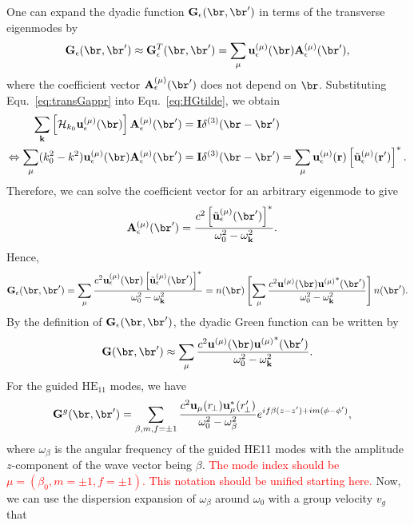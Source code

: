 \documentclass[]{report}
\begin{document}
One can expand the dyadic function $ \mathbf{G}_\epsilon(\br,\br') $ in terms of the transverse eigenmodes by
\begin{align}
\mathbf{G}_\epsilon(\br,\br')\approx\mathbf{G}_\epsilon^T(\br,\br')= \sum_{\mu} \mathbf{u}_\epsilon^{(\mu)}(\br) \mathbf{A}_\epsilon^{(\mu)}(\br'), \label{eq:transGappr}
\end{align}
where the coefficient vector $\mathbf{A}_\epsilon^{(\mu)}(\br')  $ does not depend on $ \br $.
Substituting Equ.~\eqref{eq:transGappr} into Equ.~\eqref{eq:HGtilde}, we obtain
\begin{align}
\sum_{\mathbf{k}} \left[ \mathcal{H}_{k_0}  \mathbf{u}_\epsilon^{(\mu)}(\br)\right] \mathbf{A}_\epsilon^{(\mu)}(\br') &= \mathbf{I}\delta^{(3)}(\br-\br')\\
\Leftrightarrow \sum_\mu (k_0^2-k^2) \mathbf{u}_\epsilon^{(\mu)}(\br) \mathbf{A}_\epsilon^{(\mu)}(\br') &= \mathbf{I}\delta^{(3)}(\br-\br') = \sum_{\mu} \mathbf{u}_\epsilon^{(\mu)}(\mathbf{r} )\left[\tilde{\mathbf{u}}_\epsilon^{(\mu)}(\mathbf{r}^\prime )\right]^*.
\end{align}
Therefore, we can solve the coefficient vector for an arbitrary eigenmode to give
\begin{align}
\mathbf{A}_\epsilon^{(\mu)}(\br') &= \frac{c^2 \left[ \tilde{\mathbf{u}}_\epsilon^{(\mu)}(\br')\right]^*}{\omega_0^2-\omega_{\mathbf{k}}^2}.
\end{align}
Hence, 
\begin{align}
\mathbf{G}_\epsilon(\br,\br')= \sum_{\mu} \frac{c^2\mathbf{u}_\epsilon^{(\mu)}(\br)\left[\tilde{\mathbf{u}}_\epsilon^{(\mu)}(\br')\right]^*}{\omega_0^2-\omega_{\mathbf{k}}^2} = n(\br) \left[\sum_{\mu} \frac{c^2 {\mathbf{u}}^{(\mu)}(\br) {\mathbf{u}^{(\mu)}}^*(\br')}{\omega_0^2-\omega_{\mathbf{k}}^2} \right]n(\br').
\end{align}
By the definition of $\mathbf{G}_\epsilon(\br,\br')  $, the dyadic Green function can be written by 
\begin{align}
\mathbf{G}(\br,\br')\approx \sum_{\mu} \frac{c^2\mathbf{u}^{(\mu)}(\br) {\mathbf{u}^{(\mu)}}^*(\br')}{\omega_0^2-\omega_{\mathbf{k}}^2}.
\end{align}
For the guided $\mathrm{HE}_{11}$ modes, we have 
\begin{align}
\mathbf{G}^g(\br,\br') &= \sum_{\beta,m,f=\pm 1} \frac{c^2\mathbf{u}_{\mu}(r\!_\perp)\mathbf{u}^*_{\mu}(r_{\!\perp}^\prime)}{\omega_0^2-\omega_\beta^2}e^{if\beta(z-z')+im(\phi-\phi')},\label{eq:Gganaly}
\end{align}
where $ \omega_\beta $ is the angular frequency of the guided HE11 modes with the amplitude $ z $-component of the wave vector being $ \beta $. \textcolor{red}{The mode index should be $ \mu=(\beta_0,m=\pm 1,f=\pm 1) $. This notation should be unified starting here.} Now, we can use the dispersion expansion of $ \omega_\beta $ around $ \omega_0 $ with a group velocity $ v_g $ that 
\end{document}
